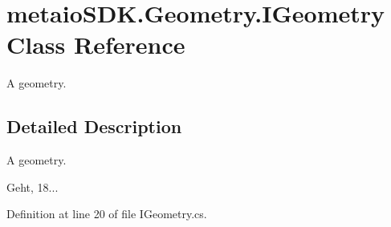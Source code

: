 \section{metaio\-S\-D\-K.\-Geometry.\-I\-Geometry Class Reference}
\label{classmetaio_s_d_k_1_1_geometry_1_1_i_geometry}


A geometry.  




\subsection{Detailed Description}
A geometry. 

Geht, 18... 

Definition at line 20 of file I\-Geometry.\-cs.


